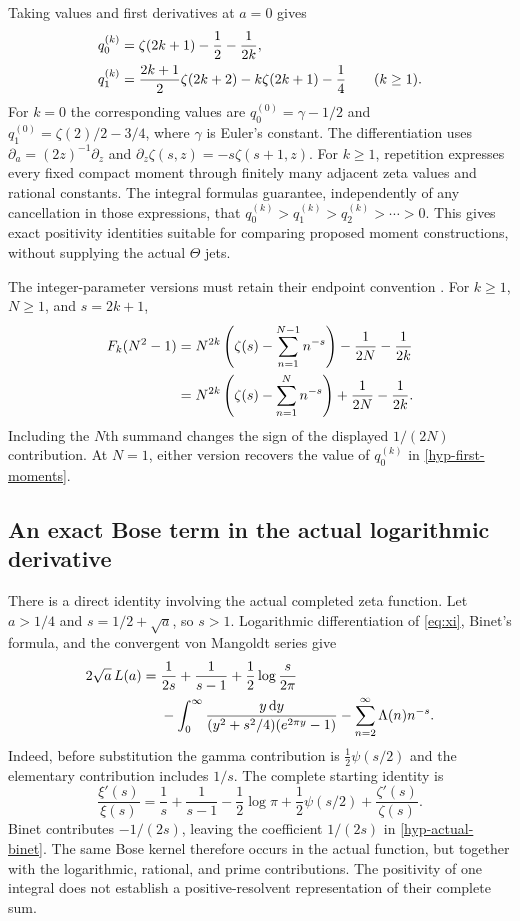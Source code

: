 \documentclass[11pt,a4paper]{article}
\numberwithin{equation}{section}
\theoremstyle{definition}
\theoremstyle{remark}
\newcommand{\dd}{\,\mathrm d}
\begin{document}
Taking values and first derivatives at $a=0$ gives
\begin{align}
q_0^{(k)}&=\zeta(2k+1)-\frac12-\frac1{2k},\notag\\
q_1^{(k)}&=\frac{2k+1}{2}\zeta(2k+2)
-k\zeta(2k+1)-\frac14\qquad(k\geq1).
\label{hyp-first-moments}
\end{align}
For $k=0$ the corresponding values are
$q_0^{(0)}=\gamma-1/2$ and
$q_1^{(0)}=\zeta(2)/2-3/4$, where $\gamma$ is Euler's constant.
The differentiation uses $\partial_a=(2z)^{-1}\partial_z$ and
$\partial_z\zeta(s,z)=-s\zeta(s+1,z)$. For $k\geq1$, repetition
expresses every fixed compact moment through finitely many adjacent zeta values and
rational constants. The integral formulas guarantee, independently of
any cancellation in those expressions, that
$q_0^{(k)}>q_1^{(k)}>q_2^{(k)}>\cdots>0$.
This gives exact positivity identities suitable for comparing proposed
moment constructions, without supplying the actual $\Theta$ jets.

The integer-parameter versions must retain their endpoint convention
\cite{hyp-pole}. For $k\geq1$, $N\geq1$, and $s=2k+1$,
\begin{align}
F_k(N^2-1)
&=N^{2k}\left(\zeta(s)-\sum_{n=1}^{N-1}n^{-s}\right)
-\frac1{2N}-\frac1{2k}\notag\\
&=N^{2k}\left(\zeta(s)-\sum_{n=1}^{N}n^{-s}\right)
+\frac1{2N}-\frac1{2k}.
\label{hyp-integer-endpoint}
\end{align}
Including the $N$th summand changes the sign of the displayed
$1/(2N)$ contribution. At $N=1$, either version recovers
the value of $q_0^{(k)}$ in \eqref{hyp-first-moments}.

\subsection{An exact Bose term in the actual logarithmic derivative}

There is a direct identity involving the actual completed zeta function.
Let $a>1/4$ and $s=1/2+\sqrt a$, so $s>1$. Logarithmic
differentiation of \eqref{eq:xi}, Binet's formula, and the convergent
von Mangoldt series \cite{dlmf-binet,dlmf-mangoldt} give
\begin{align}
2\sqrt a\,L(a)
={}&\frac1{2s}+\frac1{s-1}+\frac12\log\frac{s}{2\pi}\notag\\
&-\int_0^\infty
\frac{y\dd y}{(y^2+s^2/4)(e^{2\pi y}-1)}
-\sum_{n=2}^{\infty}\Lambda(n)n^{-s}.
\label{hyp-actual-binet}
\end{align}
Indeed, before substitution the gamma contribution is
$\tfrac12\psi(s/2)$ and the elementary contribution includes $1/s$.
The complete starting identity is
\[
\frac{\xi'(s)}{\xi(s)}
=\frac1s+\frac1{s-1}-\frac12\log\pi
+\frac12\psi(s/2)+\frac{\zeta'(s)}{\zeta(s)}.
\]
Binet contributes $-1/(2s)$, leaving the coefficient $1/(2s)$
in \eqref{hyp-actual-binet}. The same Bose kernel therefore occurs
in the actual function, but together with the logarithmic, rational,
and prime contributions. The positivity of one integral does not
establish a positive-resolvent representation of their complete sum.
\end{document}
